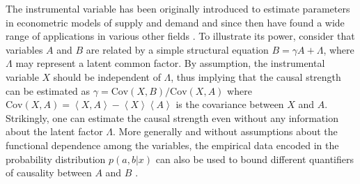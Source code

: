 \documentclass[letterpaper]{article}
\newcommand{\mean}[1]{\left\langle #1 \right\rangle}
\begin{document}
The instrumental variable has been originally introduced to estimate parameters
in econometric models of supply and demand \cite{} and since then have found a
wide range of applications in various other fields \cite{}. To illustrate its
power, consider that variables $A$ and $B$ are related by a simple structural
equation $B=\gamma A +\Lambda$, where $\Lambda$ may represent a latent common
factor. By assumption, the instrumental variable $X$ should be independent of
$\Lambda$, thus implying that the causal strength can be estimated as $\gamma=
\mathrm{Cov}(X,B)/\mathrm{Cov}(X,A)$ where $\mathrm{Cov}(X,A)= \mean{X,A} -
\mean{X}\mean{A}$ is the covariance between $X$ and $A$. Strikingly, one can
estimate the causal strength even without any information about the latent
factor $\Lambda$. More generally and without assumptions about the functional
dependence among the variables, the empirical data encoded in the probability
distribution $p(a,b \vert x)$ can also be used to bound different quantifiers of
causality between $A$ and $B$ \cite{}.


\end{document}
